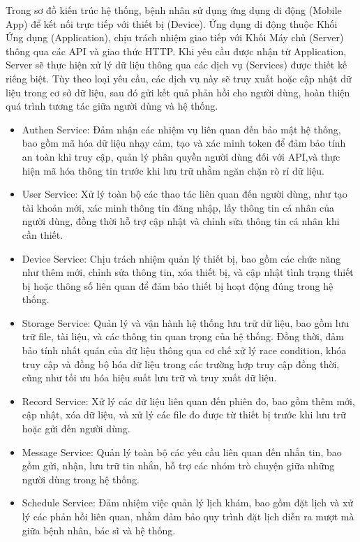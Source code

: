 Trong sơ đồ kiến trúc hệ thống, bệnh nhân sử dụng ứng dụng di động (Mobile App) để kết nối trực tiếp với thiết bị (Device).
Ứng dụng di động thuộc Khối Ứng dụng (Application), chịu trách nhiệm giao tiếp với Khối Máy chủ (Server) thông qua các API và giao thức HTTP.
Khi yêu cầu được nhận từ Application, Server sẽ thực hiện xử lý dữ liệu thông qua các dịch vụ (Services) được thiết kế riêng biệt.
Tùy theo loại yêu cầu, các dịch vụ này sẽ truy xuất hoặc cập nhật dữ liệu trong cơ sở dữ liệu, sau đó gửi kết quả phản hồi cho người dùng,
hoàn thiện quá trình tương tác giữa người dùng và hệ thống.\begin{adjustwidth}{1.5em}{}
	\begin{itemize}
		\item Authen Service: Đảm nhận các nhiệm vụ liên quan đến bảo mật hệ thống, bao gồm mã hóa dữ liệu nhạy cảm, tạo và xác minh token để đảm bảo tính an toàn khi truy cập,
		      quản lý phân quyền người dùng đối với API,và thực hiện mã hóa thông tin trước khi lưu trữ nhằm ngăn chặn rò rỉ dữ liệu.
		\item User Service: Xử lý toàn bộ các thao tác liên quan đến người dùng, như tạo tài khoản mới, xác minh thông tin đăng nhập, lấy thông tin cá nhân của người dùng,
		      đồng thời hỗ trợ cập nhật và chỉnh sửa thông tin cá nhân khi cần thiết.
		\item Device Service: Chịu trách nhiệm quản lý thiết bị, bao gồm các chức năng như thêm mới, chỉnh sửa thông tin, xóa thiết bị,
		      và cập nhật tình trạng thiết bị hoặc thông số liên quan để đảm bảo thiết bị hoạt động đúng trong hệ thống.
		\item Storage Service: Quản lý và vận hành hệ thống lưu trữ dữ liệu, bao gồm lưu trữ file, tài liệu, và các thông tin quan trọng của hệ thống.
		      Đồng thời, đảm bảo tính nhất quán của dữ liệu thông qua cơ chế xử lý race condition, khóa truy cập và đồng bộ hóa dữ liệu trong các trường hợp truy cập đồng thời,
		      cũng như tối ưu hóa hiệu suất lưu trữ và truy xuất dữ liệu.
		\item Record Service: Xử lý các dữ liệu liên quan đến phiên đo, bao gồm thêm mới, cập nhật, xóa dữ liệu, và xử lý các file đo được từ thiết bị trước khi lưu trữ hoặc gửi đến người dùng.
		\item Message Service: Quản lý toàn bộ các yêu cầu liên quan đến nhắn tin, bao gồm gửi, nhận, lưu trữ tin nhắn, hỗ trợ các nhóm trò chuyện giữa những người dùng trong hệ thống.
		\item Schedule Service: Đảm nhiệm việc quản lý lịch khám, bao gồm đặt lịch và xử lý các phản hồi liên quan, nhằm đảm bảo quy trình đặt lịch diễn ra mượt mà giữa bệnh nhân, bác sĩ và hệ thống.

\end{itemize}
\end{adjustwidth}
